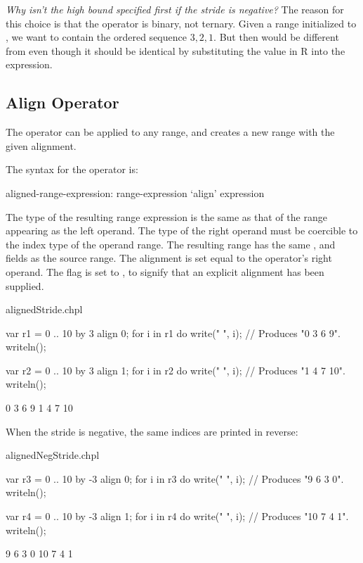 \begin{rationale}
{\it Why isn't the high bound specified first if the stride is
negative?}  The reason for this choice is that the  operator
is binary, not ternary.  Given a range  initialized
to , we want  to contain the ordered sequence
$3,2,1$.  But then  would be different from  even though it should be identical by substituting the value in
R into the expression.
\end{rationale}


\subsection{Align Operator}
\label{Align_Operator}

The  operator can be applied to any range, and creates a new range
with the given alignment.  

The syntax for the  operator is:
\begin{syntax}
aligned-range-expression:
  range-expression `align' expression
\end{syntax}
\noindent The type of the resulting range expression is the same as that of the
range appearing as the left operand.  The type of the right operand must be
coercible to the index type of the operand range.  
The resulting range has the
same ,  and  fields as the source range. The
alignment is set equal to the  operator's right operand.
The  flag is set to , to signify that an explicit
alignment has been supplied.

\begin{chapelexample}{alignedStride.chpl}
\begin{chapel}
var r1 = 0 .. 10 by 3 align 0;
for i in r1 do
  write(" ", i);			// Produces "0 3 6 9".
writeln();

var r2 = 0 .. 10 by 3 align 1;
for i in r2 do
  write(" ", i);			// Produces "1 4 7 10".
writeln();
\end{chapel}
\begin{chapeloutput}
 0 3 6 9
 1 4 7 10
\end{chapeloutput}
\end{chapelexample}

When the stride is negative, the same indices are printed in reverse:
\begin{chapelexample}{alignedNegStride.chpl}
\begin{chapel}
var r3 = 0 .. 10 by -3 align 0;
for i in r3 do
  write(" ", i);			// Produces "9 6 3 0".
writeln();

var r4 = 0 .. 10 by -3 align 1;
for i in r4 do
  write(" ", i);			// Produces "10 7 4 1".
writeln();
\end{chapel}
\begin{chapeloutput}
 9 6 3 0
 10 7 4 1
\end{chapeloutput}
\end{chapelexample}

